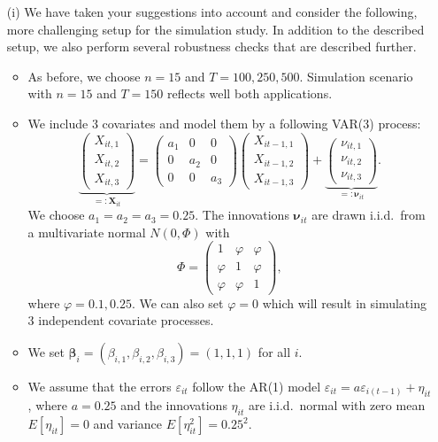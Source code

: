 \documentclass[a4paper,12pt]{article}
\begin{document}
\begin{enumerate}[label=\arabic*.,leftmargin=0.6cm]
{\begin{itemize}[topsep=0pt]
\item[(i)] We have taken your suggestions into account and consider the following, more challenging setup for the simulation study. In addition to the described setup, we also perform several robustness checks that are described further.

\begin{itemize}[label=--,leftmargin=0.45cm,itemsep=0pt]

\item As before, we choose $n=15$ and $T=100,250,500$. Simulation scenario with $n=15$ and $T=150$ reflects well both applications.
  
\item We include $3$ covariates and model them by a following VAR(3) process:
\[ \underbrace{\begin{pmatrix} X_{it,1} \\ X_{it,2} \\ X_{it,3} \end{pmatrix}}_{=: \boldsymbol{X}_{it}} = \begin{pmatrix} a_1 & 0 & 0 \\ 0 & a_2 & 0 \\ 0 & 0 & a_3 \end{pmatrix} \begin{pmatrix} X_{it-1,1} \\ X_{it-1,2} \\ X_{it-1,3} \end{pmatrix} + \underbrace{\begin{pmatrix} \nu_{it,1} \\ \nu_{it,2} \\ \nu_{it,3} \end{pmatrix}}_{=: \boldsymbol{\nu}_{it}}. \] 
We choose $a_1 = a_2 = a_3 = 0.25$. The innovations $\boldsymbol{\nu}_{it}$ are drawn i.i.d.\ from a multivariate normal $N(0,\Phi)$ with
\[ \Phi = \begin{pmatrix} 1 & \varphi & \varphi \\ \varphi & 1 & \varphi \\ \varphi & \varphi & 1 \end{pmatrix}, \]
where $\varphi=0.1, 0.25$. We can also set $\varphi = 0$ which will result in simulating 3 independent covariate processes. 

\item We set $\boldsymbol{\beta}_i = (\beta_{i,1},\beta_{i,2},\beta_{i,3}) = (1,1,1)$ for all $i$.

\item We assume that the errors $\varepsilon_{it}$ follow the AR(1) model $\varepsilon_{it} = a \varepsilon_{i(t-1)} + \eta_{it}$, where $a=0.25$ and the innovations $\eta_{it}$ are i.i.d.\ normal with zero mean $E[\eta_{it}]=0$ and variance $E[\eta_{it}^2]=0.25^2$. 


\end{itemize}
\end{itemize}}
\end{enumerate}
\end{document}
